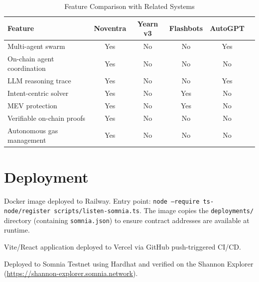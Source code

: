 \documentclass[11pt,a4paper]{article}
\begin{document}
\begin{table}[H]
\centering
\caption{Feature Comparison with Related Systems}
\begin{tabular}{@{}lccccc@{}}
  \toprule
  \textbf{Feature}           & \textbf{Noventra} & \textbf{Yearn v3} & \textbf{Flashbots} & \textbf{AutoGPT} \\
  \midrule
  Multi-agent swarm          & Yes & No  & No  & Yes \\
  On-chain agent coordination & Yes & No  & No  & No  \\
  LLM reasoning trace        & Yes & No  & No  & Yes \\
  Intent-centric solver      & Yes & No  & Yes & No  \\
  MEV protection             & Yes & No  & Yes & No  \\
  Verifiable on-chain proofs & Yes & No  & No  & No  \\
  Autonomous gas management  & Yes & No  & No  & No  \\
  \bottomrule
\end{tabular}
\end{table}

\section{Deployment}

\begin{description}[leftmargin=1.8em, style=nextline]
  \item[Agent Swarm.] Docker image deployed to Railway.
        Entry point: \texttt{node --require ts-node/register scripts/listen-somnia.ts}.
        The image copies the \texttt{deployments/} directory (containing
        \texttt{somnia.json}) to ensure contract addresses are available at runtime.

  \item[Frontend.] Vite/React application deployed to Vercel via GitHub push-triggered CI/CD.

  \item[Contracts.] Deployed to Somnia Testnet using Hardhat and verified on the
        Shannon Explorer (\url{https://shannon-explorer.somnia.network}).
\end{description}

\end{document}
